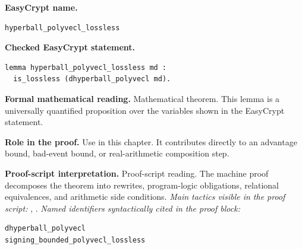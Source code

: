 \begin{formaltheorem}
\noindent\textbf{EasyCrypt name.}
\begin{lstlisting}[language=EasyCrypt,basicstyle=\ttfamily\scriptsize]
hyperball_polyvecl_lossless
\end{lstlisting}
\noindent\textbf{Checked EasyCrypt statement.}
\begin{lstlisting}[language=EasyCrypt,basicstyle=\ttfamily\scriptsize]
lemma hyperball_polyvecl_lossless md :
  is_lossless (dhyperball_polyvecl md).
\end{lstlisting}
\noindent\textbf{Formal mathematical reading.}
Mathematical theorem. This lemma is a universally quantified proposition over the variables shown in the EasyCrypt statement.

\noindent\textbf{Role in the proof.}
Use in this chapter. It contributes directly to an advantage bound, bad-event bound, or real-arithmetic composition step.

\noindent\textbf{Proof-script interpretation.}
Proof-script reading. The machine proof decomposes the theorem into rewrites, program-logic obligations, relational equivalences, and arithmetic side conditions.
\emph{Main tactics visible in the proof script:} , .
\emph{Named identifiers syntactically cited in the proof block:}
\begin{lstlisting}[language=EasyCrypt,basicstyle=\ttfamily\scriptsize]
dhyperball_polyvecl
signing_bounded_polyvecl_lossless
\end{lstlisting}

\end{formaltheorem}

